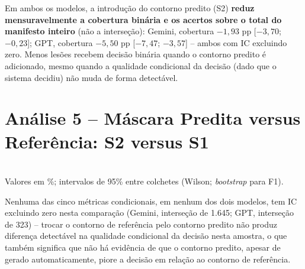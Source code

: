 Em ambos os modelos, a introdução do contorno predito (S2) \textbf{reduz mensuravelmente a cobertura binária e os acertos sobre o total do manifesto inteiro} (não a interseção): Gemini, cobertura $-1,93$ pp [$-3,70$; $-0,23$]; GPT, cobertura $-5,50$ pp [$-7,47$; $-3,57$] -- ambos com IC excluindo zero. Menos lesões recebem decisão binária quando o contorno predito é adicionado, mesmo quando a qualidade condicional da decisão (dado que o sistema decidiu) não muda de forma detectável.

\section{Análise 5 -- Máscara Predita versus Referência: S2 versus S1}
\label{sec:resultados_analise5}

\begin{table}[H]
	\centering
	\caption{Análise 5 -- multiagente em S2 versus S1, por modelo, 3.000 lesões.}
	\label{tab:analise5}
	\\ \footnotesize Valores em \%; intervalos de 95\% entre colchetes (Wilson; \textit{bootstrap} para F1).
\end{table}

Nenhuma das cinco métricas condicionais, em nenhum dos dois modelos, tem IC excluindo zero nesta comparação (Gemini, interseção de 1.645; GPT, interseção de 323) -- trocar o contorno de referência pelo contorno predito não produz diferença detectável na qualidade condicional da decisão nesta amostra, o que também significa que não há evidência de que o contorno predito, apesar de gerado automaticamente, piore a decisão em relação ao contorno de referência.

